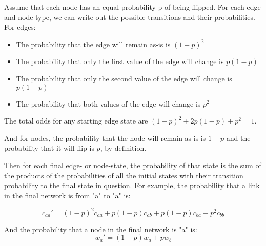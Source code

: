 \documentclass[a4paper]{article}
\begin{document}
Assume that each node has an equal probability p of being flipped. For each edge and node type, we can write out the possible transitions and their probabilities. For edges:

\begin{itemize}
\item The probability that the edge will remain as-is is $(1-p)^2$
\item The probability that only the first value of the edge will change is $p(1-p)$
\item The probability that only the second value of the edge will change is $p(1-p)$
\item The probability that both values of the edge will change is $p^2$
\end{itemize}

The total odds for any starting edge state are $(1-p)^2 + 2p(1-p) + p^2 = 1$.

And for nodes, the probability that the node will remain as is is $1-p$ and the probability that it will flip is $p$, by definition.

Then for each final edge- or node-state, the probability of that state is the sum of the products of the probabilities of all the initial states with their transition probability to the final state in question. For example, the probability that a link in the final network is from "a" to "a" is:

\begin{equation*}
c_{aa}' = (1-p)^2c_{aa} + p(1-p)c_{ab} + p(1-p)c_{ba} + p^2c_{bb}
\end{equation*}

And the probability that a node in the final network is "a" is:
\begin{equation*}
w_a' = (1-p)w_a + pw_b
\end{equation*}
\end{document}

